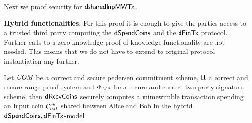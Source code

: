 Next we proof security for $\mathsf{dsharedInpMWTx}$.

\textbf{Hybrid functionalities}: For this proof it is enough to give the parties access to a trusted third party computing the $\mathsf{dSpendCoins}$ and the $\mathsf{dFinTx}$ protocol.
Further calls to a zero-knowledge proof of knowledge functionality are not needed.
This means that we do not have to extend to original protocol instantiation any further.

\begin{theorem} \label{teo:atom:sec-dshared-inp}
    Let $\mathit{COM}$ be a correct and secure pedersen commitment scheme, $\Pi$ a correct and secure range proof system and $\Phi_{\mathit{MP}}$ be a secure and correct two-party signature scheme, then $\mathsf{dRecvCoins}$ securely computes a mimewimble transaction spending an input coin $\mathcal{C}_{\mathit{out}}^{\mathit{sh}}$ shared between Alice and Bob in the hybrid $\mathsf{dSpendCoins},\mathsf{dFinTx}$-model
\end{theorem}

